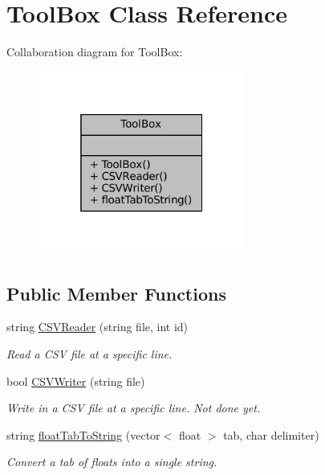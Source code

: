 \hypertarget{class_tool_box}{}\section{Tool\+Box Class Reference}
\label{class_tool_box}


Collaboration diagram for Tool\+Box\+:
\nopagebreak
\begin{figure}[H]
\begin{center}
\leavevmode
\includegraphics[width=193pt]{class_tool_box__coll__graph}
\end{center}
\end{figure}
\subsection*{Public Member Functions}
\begin{DoxyCompactItemize}
\item 
string \mbox{\hyperlink{class_tool_box_a2dcc60d601f6460bc0c702db398e6279}{C\+S\+V\+Reader}} (string file, int id)
\begin{DoxyCompactList}\small\item\em Read a C\+SV file at a specific line. \end{DoxyCompactList}\item 
bool \mbox{\hyperlink{class_tool_box_a367d73930064f727b8ea349c64511535}{C\+S\+V\+Writer}} (string file)
\begin{DoxyCompactList}\small\item\em Write in a C\+SV file at a specific line. Not done yet. \end{DoxyCompactList}\item 
string \mbox{\hyperlink{class_tool_box_a268881f9f0d13d7bf048b7c647376e65}{float\+Tab\+To\+String}} (vector$<$ float $>$ tab, char delimiter)
\begin{DoxyCompactList}\small\item\em Convert a tab of floats into a single string. \end{DoxyCompactList}\end{DoxyCompactItemize}


